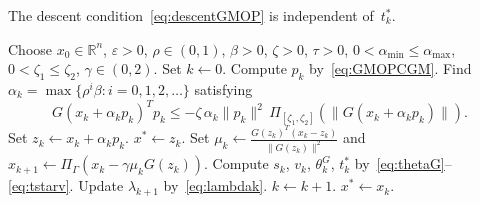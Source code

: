 \documentclass{article}
\theoremstyle{plain}
\theoremstyle{definition}
\theoremstyle{remark}
\newcommand{\R}{\mathbb{R}}
\newcommand{\norm}[1]{\|#1\|}
\newcommand{\PG}{\Pi_{\Gamma}}
\newcommand{\PI}[1]{\Pi_{#1}}
\newcommand{\algoname}[1]{{\small\texttt{#1}}}
\newcommand{\GMOPCGM}{\algoname{GMOPCGM}}
\newcommand{\thetaG}{\theta_k^{\scriptscriptstyle G}}     %
\newcommand{\tstar}{t_k^*}                                 %
\begin{document}
The descent condition~\eqref{eq:descentGMOP} is independent of~$\tstar$.

\begin{algorithm}[ht]
\caption{Generalized Modified Optimal Perry Conjugate Gradient Method (\GMOPCGM)}
\label{alg:GMOPCGM}
\begin{algorithmic}[1]
  \State Choose $x_0 \in \R^n$, $\varepsilon > 0$, $\rho \in (0,1)$, $\beta > 0$, $\zeta > 0$, $\tau > 0$,
  \Statex \hspace{1.5em} $0 < \alpha_{\min} \leq \alpha_{\max}$, $0 < \zeta_1 \leq \zeta_2$, $\gamma \in (0,2)$. Set $k \gets 0$.
  \While{$\norm{G_k} > \varepsilon$}
    \State Compute $p_k$ by~\eqref{eq:GMOPCGM}.
    \State Find $\alpha_k = \max\{\rho^i \beta : i = 0,1,2,\ldots\}$ satisfying
    \begin{equation}\label{eq:linesearch1}
      G(x_k + \alpha_k p_k)^T p_k \leq -\zeta\,\alpha_k\norm{p_k}^2\,\PI{[\zeta_1,\zeta_2]}(\norm{G(x_k + \alpha_k p_k)}).
    \end{equation}
    \State Set $z_k \gets x_k + \alpha_k p_k$.
    \If{$z_k \in \Gamma$ and $\norm{G(z_k)} \leq \varepsilon$}
      \State \Return $x^* \gets z_k$.
    \EndIf
    \State Set $\mu_k \gets \frac{G(z_k)^T(x_k - z_k)}{\norm{G(z_k)}^2}$ and $x_{k+1} \gets \PG(x_k - \gamma\mu_k G(z_k))$.
    \State Compute $s_k$, $v_k$, $\thetaG$, $\tstar$ by~\eqref{eq:thetaG}--\eqref{eq:tstarv}.
    \State Update $\lambda_{k+1}$ by~\eqref{eq:lambdak}.
    \State $k \gets k+1$.
  \EndWhile
  \State \Return $x^* \gets x_k$.
\end{algorithmic}
\end{algorithm}
\end{document}
